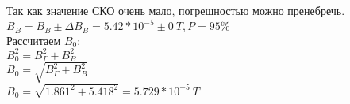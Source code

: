 Так как значение СКО очень мало, погрешностью можно пренебречь.
\\

$ B_{B} = 
\overline{B_{B}} \pm \varDelta \overline{B_{B}} = 
5.42 * 10^{-5} \pm 0 \ T, P = 95\%
$
\\


Рассчитаем $ B_0 $:\\

$ 
B_0^2 = 
B_\Gamma^2 + B_B^2 
$
\\

$ 
B_0 = 
\sqrt{B_\Gamma^2 + B_B^2}
$
\\

$ 
B_0 = 
\sqrt{1.861^2 + 5.418^2} = 
5.729 * 10^{-5} \ T
$
\\


